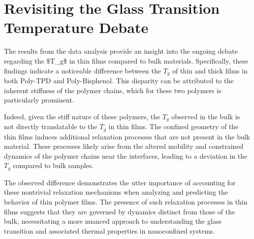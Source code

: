 \section{Revisiting the Glass Transition Temperature Debate}

The results from the data analysis provide an insight into the ongoing debate regarding the \ac{$T_g$} in thin films compared to bulk materials. Specifically, these findings indicate a noticeable difference between the \(T_g\) of thin and thick films in both Poly-TPD and Poly-Bisphenol. This disparity can be attributed to the inherent stiffness of the polymer chains, which for these two polymers is particularly prominent.

Indeed, given the stiff nature of these polymers, the \(T_g\) observed in the bulk is not directly translatable to the \(T_g\) in thin films. The confined geometry of the thin films induces additional relaxation processes that are not present in the bulk material. These processes likely arise from the altered mobility and constrained dynamics of the polymer chains near the interfaces, leading to a deviation in the \(T_g\) compared to bulk samples.

The observed difference demonstrates the utter importance of accounting for these nontrivial relaxation mechanisms when analyzing and predicting the behavior of thin polymer films. The presence of such relaxation processes in thin films suggests that they are governed by dynamics distinct from those of the bulk, necessitating a more nuanced approach to understanding the glass transition and associated thermal properties in nanoconfined systems.
